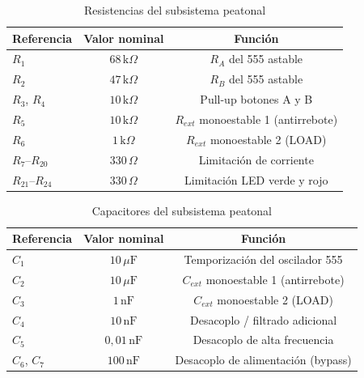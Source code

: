\documentclass[journal]{IEEEtran}
\begin{document}
\begin{table}[htbp]
    \centering
    \caption{Resistencias del subsistema peatonal}
    \label{tab:res}
    \begin{tabular}{lcc}
        \toprule
        \textbf{Referencia} & \textbf{Valor nominal} & \textbf{Función} \\
        \midrule
        $R_1$            & $68\,\text{k}\Omega$   & $R_A$ del 555 astable \\
        $R_2$            & $47\,\text{k}\Omega$   & $R_B$ del 555 astable \\
        $R_3$, $R_4$     & $10\,\text{k}\Omega$   & Pull-up botones A y B \\
        $R_5$            & $10\,\text{k}\Omega$   & $R_{ext}$ monoestable 1 (antirrebote) \\
        $R_6$            & $1\,\text{k}\Omega$    & $R_{ext}$ monoestable 2 (LOAD) \\
        $R_7$--$R_{20}$  & $330\,\Omega$          & Limitación de corriente \\
        $R_{21}$--$R_{24}$ & $330\,\Omega$        & Limitación LED verde y rojo \\
        \bottomrule
    \end{tabular}
\end{table}

\begin{table}[htbp]
    \centering
    \caption{Capacitores del subsistema peatonal}
    \label{tab:cap}
    \begin{tabular}{lcc}
        \toprule
        \textbf{Referencia} & \textbf{Valor nominal} & \textbf{Función} \\
        \midrule
        $C_1$        & $10\,\mu\text{F}$     & Temporización del oscilador 555 \\
        $C_2$        & $10\,\mu\text{F}$     & $C_{ext}$ monoestable 1 (antirrebote) \\
        $C_3$        & $1\,\text{nF}$        & $C_{ext}$ monoestable 2 (LOAD) \\
        $C_4$        & $10\,\text{nF}$       & Desacoplo / filtrado adicional \\
        $C_5$        & $0{,}01\,\text{nF}$   & Desacoplo de alta frecuencia \\
        $C_6$, $C_7$ & $100\,\text{nF}$      & Desacoplo de alimentación (bypass) \\
        \bottomrule
    \end{tabular}
\end{table}
\end{document}
